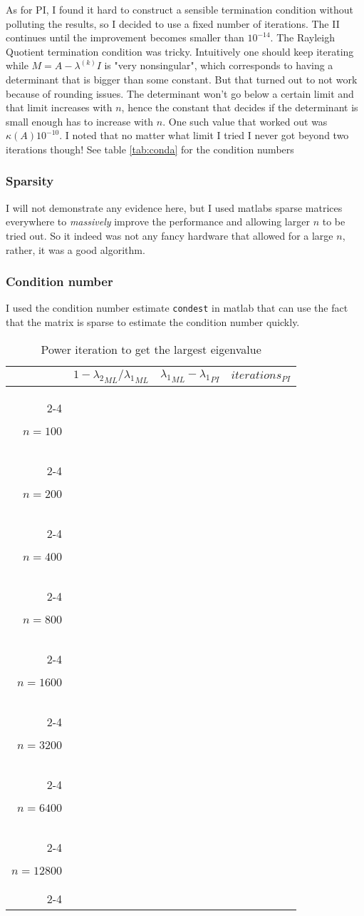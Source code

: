 \documentclass[a4paper,11pt]{article}
\begin{document}
As for PI, I found it hard to construct a sensible termination condition
without polluting the results, so I decided to use a fixed number of
iterations. The II continues until the improvement becomes smaller than
$10^{-14}$. The Rayleigh Quotient termination condition was tricky.
Intuitively one should keep iterating while $M=A-\lambda^{(k)}I$ is "very
nonsingular", which corresponds to having a determinant that is bigger
than some constant. But that turned out to not work because of rounding
issues. The determinant won't go below a certain limit and that limit
increases with $n$, hence the constant that decides if the determinant
is small enough has to increase with $n$. One such value that worked out
was $\kappa(A)10^{-10}$. I noted that no matter what limit I tried I
never got beyond two iterations though! See table \ref{tab:conda} for
the condition numbers

\subsubsection{Sparsity}

I will not demonstrate any evidence here, but I used matlabs sparse
matrices everywhere to \emph{massively} improve the performance and
allowing larger $n$ to be tried out. So it indeed was not any fancy
hardware that allowed for a large $n$, rather, it was a good algorithm.

\subsubsection{Condition number}

I used the condition number estimate \texttt{condest} in matlab that can
use the fact that the matrix is sparse to estimate the condition number
quickly.

\newcommand{\fornTwo}[1] {
  #1{100}
  #1{200}
}

\newcommand{\fornSix}[1] {
  \fornTwo{#1}
  #1{400}
  #1{800}
  #1{1600}
  #1{3200}
}

\newcommand{\fornEight}[1] {
  \fornSix{#1}
  #1{6400}
  #1{12800}
}

\newcommand{\fornTen}[1] {
  \fornEight{#1}
  #1{25600}
  #1{51200}
}

\newcommand{\pimacro}[1] {
  \ensuremath{n=#1} & 
                    & 
                    & 
                    \\ \cline{2-4}
}
\begin{table}[h]
  \centering
  \begin{tabular}{r|c|c|c|}
    \multicolumn{1}{r}{}
     & \multicolumn{1}{c}{$1-{\lambda_2}_{ML}/{\lambda_1}_{ML}$}
     & \multicolumn{1}{c}{${\lambda_1}_{ML}-{\lambda_1}_{PI}$}
     & \multicolumn{1}{c}{$iterations_{PI}$}\\
    \cline{2-4}
    \fornEight{\pimacro}
  \end{tabular}
  \caption{Power iteration to get the largest eigenvalue}
  \label{tab:powerit}
\end{table}
\end{document}
